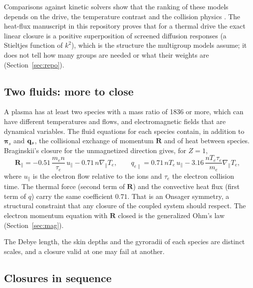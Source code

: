 Comparisons against kinetic solvers show that the ranking of these models
depends on the drive, the temperature contrast and the collision physics
\cite{Brodrick17}. The heat-flux manuscript in this repository proves that
for a thermal drive the exact linear closure is a positive superposition of
screened diffusion responses (a Stieltjes function of $k^2$), which is the
structure the multigroup models assume; it does not tell how many groups
are needed or what their weights are (Section~\ref{sec:repo}).

\subsection{Two fluids: more to close}

A plasma has at least two species with a mass ratio of 1836 or more, which
can have different temperatures and flows, and electromagnetic fields that
are dynamical variables. The fluid equations for each species contain, in
addition to $\boldsymbol\pi_s$ and $\mathbf{q}_s$, the collisional exchange of
momentum $\mathbf R$ and of heat between species. Braginskii's closure
\cite{Braginskii65} for the unmagnetized direction gives, for $Z=1$,
\begin{equation}
  \mathbf R_\parallel=-0.51\,\frac{m_en}{\tau_e}\,u_\parallel
      -0.71\,n\nabla_\parallel T_e,
  \qquad
  q_{e\parallel}=0.71\,nT_e\,u_\parallel
      -3.16\,\frac{nT_e\tau_e}{m_e}\nabla_\parallel T_e ,
\end{equation}
where $u_\parallel$ is the electron flow relative to the ions and $\tau_e$
the electron collision time. The thermal force (second term of
$\mathbf R$) and the convective heat flux (first term of $q$) carry the
same coefficient $0.71$. That is an Onsager symmetry, a structural
constraint that any closure of the coupled system should respect. The
electron momentum equation with $\mathbf R$ closed is the generalized Ohm's
law (Section~\ref{sec:mag}).

The Debye length, the skin depths and the gyroradii of each species are
distinct scales, and a closure valid at one may fail at another.

\subsection{Closures in sequence}

